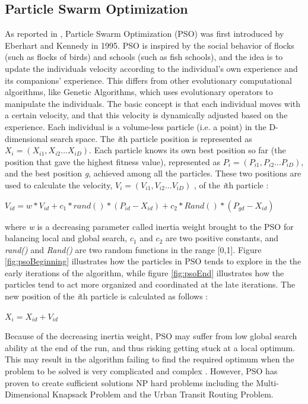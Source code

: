 \subsection{Particle Swarm Optimization}
\label{subsec:pso}
As reported in \citet{shi99}, Particle Swarm Optimization (PSO) was first introduced by Eberhart and Kennedy in 1995. PSO is inspired by the social behavior of flocks (such as flocks of birds) and schools (such as fish schools), and the idea is to update the individuals velocity according to the individual's own experience and its companions' experience. This differs from other evolutionary computational algorithms, like Genetic Algorithms, which uses evolutionary operators to manipulate the individuals. The basic concept is that each individual moves with a certain velocity, and that this velocity is dynamically adjusted based on the experience. Each individual is a volume-less particle (i.e. a point) in the D-dimensional search space. The \textit{i}th particle position is represented as $X_i = (X_{i1},X_{i2}...X_{iD})$. Each particle knows its own best position so far (the position that gave the highest fitness value), represented as $P_i = (P_{i1},P_{i2}...P_{iD})$, and the best position \textit{g}, achieved among all the particles. These two positions are used to calculate the velocity, $V_i = (V_{i1},V_{i2}...V_{iD})$ ,  of the \textit{i}th particle \citep{shi99}: 
\newline
\newline
\centerline{$V_{id} = w * V_{id} + c_1 * rand() * (P_{id}-X_{id}) + c_2 * Rand() * (P_{gd}-X_{id})$}
\newline
\newline
where \textit{w} is a decreasing parameter called inertia weight brought to the PSO for balancing local and global search, $c_1$ and $c_2$ are two positive constants, and \textit{rand()} and \textit{Rand()} are two random functions in the range [0,1]. Figure \ref{fig:psoBeginning} illustrates how the particles in PSO tends to explore in the the early iterations of the algorithm, while figure \ref{fig:psoEnd} illustrates how the particles tend to act more organized and coordinated at the late iterations. The new position of the \textit{i}th particle is calculated as follows \cite{shi99}:
\newline
\newline
\centerline{$X_i = X_{id} + V_{id}$}
\newline
\newline
Because of the decreasing inertia weight, PSO may suffer from low global search ability at the end of the run, and thus risking getting stuck at a local optimum. This may result in the algorithm failing to find the required optimum when the problem to be solved is very complicated and complex \cite{shi99}. However, PSO has proven to create sufficient solutions NP hard problems including the Multi-Dimensional Knapsack Problem\cite{wan09} and the Urban Transit Routing Problem\cite{kechagiopoulos14}. 

